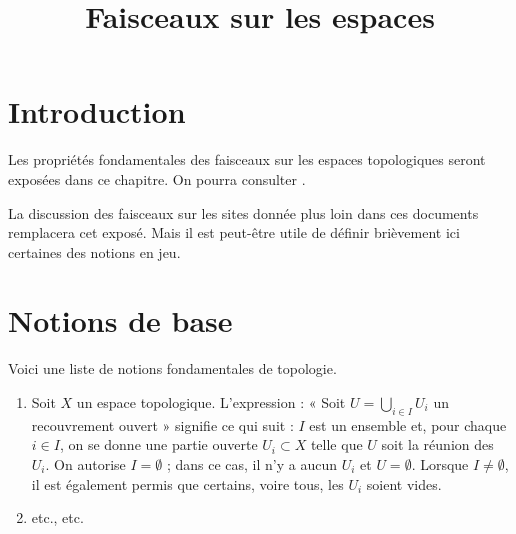 

%


\title{Faisceaux sur les espaces}


\maketitle

\label{section-phantom}

\tableofcontents

\section{Introduction}
\label{section-introduction}

\noindent
Les propriétés fondamentales des faisceaux sur les espaces topologiques
seront exposées dans ce chapitre. On pourra consulter \cite{Godement}.

\medskip\noindent
La discussion des faisceaux sur les sites donnée plus loin dans ces documents
remplacera cet exposé. Mais il est peut-être utile de définir brièvement ici
certaines des notions en jeu.











\section{Notions de base}
\label{section-sheaves-basic}

\noindent
Voici une liste de notions fondamentales de topologie.

\begin{enumerate}
\item Soit $X$ un espace topologique. L'expression : « Soit
$U = \bigcup_{i \in I} U_i$ un recouvrement ouvert » signifie ce qui
suit : $I$ est un ensemble et, pour chaque $i \in I$, on se donne
une partie ouverte $U_i \subset X$ telle que $U$ soit la
réunion des $U_i$. On autorise $I = \emptyset$ ;
dans ce cas, il n'y a aucun $U_i$ et $U = \emptyset$.
Lorsque $I \not = \emptyset$, il est également permis que
certains, voire tous, les $U_i$ soient vides.
\item etc., etc.
\end{enumerate}













